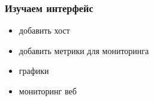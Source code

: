 \begin{frame}[fragile]
    \frametitle{Изучаем интерфейс}
        \begin{itemize}
            \item добавить хост
            \item добавить метрики для мониторинга
            \item графики
            \item мониторинг веб
        \end{itemize}
\end{frame}